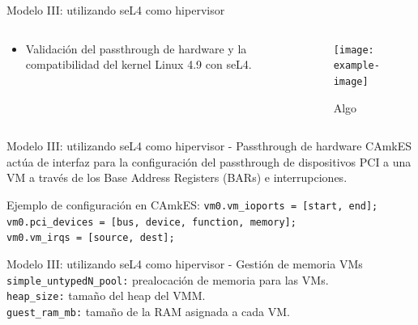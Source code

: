\documentclass[serif, aspectratio=169]{beamer}
\begin{document}
\begin{frame}{Modelo III: utilizando seL4 como hipervisor}
    \begin{columns}
        \begin{column}{0.4\textwidth}
            \begin{itemize}
                \item Validación del passthrough de hardware y la compatibilidad del kernel Linux 4.9 con seL4.
            \end{itemize}
        \end{column}
        \begin{column}{0.6\textwidth}
            \begin{figure}
                \centering
                \texttt{[image: example-image]}
                \caption{Algo}
            \end{figure}
        \end{column}
    \end{columns}
\end{frame}

\begin{frame}{Modelo III: utilizando seL4 como hipervisor - Passthrough de hardware}
    CAmkES actúa de interfaz para la configuración del passthrough de dispositivos PCI a una VM a través de los Base Address Registers (BARs) e interrupciones.
    
    \vspace*{1cm}

     \begin{block}{\small Ejemplo de configuración en CAmkES:}
          \texttt{vm0.vm\_ioports = [start, end];} \\
          \texttt{vm0.pci\_devices = [bus, device, function, memory];} \\
          \texttt{vm0.vm\_irqs = [source, dest];}
     \end{block}
\end{frame}

\begin{frame}{Modelo III: utilizando seL4 como hipervisor - Gestión de memoria VMs}
    \texttt{simple\_untypedN\_pool:} prealocación de memoria para las VMs. \\
    \texttt{heap\_size:} tamaño del heap del VMM. \\
    \texttt{guest\_ram\_mb:} tamaño de la RAM asignada a cada VM.
\end{frame}
\end{document}
